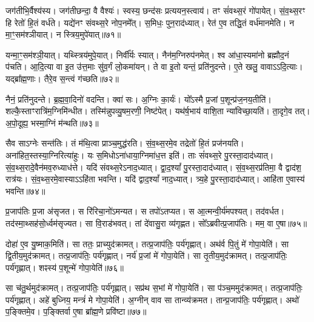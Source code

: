 जग॑तीभि॒र्वैश्य॑स्य।
जग॑तीछन्दा॒ वै वैश्यः॑।
स्वस्य॒ छन्द॑सः प्रत्ययन॒स्त्वाय॑।
तꣳ सं॑वथ्स॒रं गो॑पायेत्।
सं॒व॒थ्स॒रꣳ हि रेतो॑ हि॒तं वर्ध॑ते।
यद्ये॑नꣳ संवथ्स॒रे नोप॒नमे᳚त्।
स॒मिधः॒ पुन॒राद॑ध्यात्।
रेत॑ ए॒व तद्धि॒तं वर्ध॑मानमेति।
न मा॒ꣳ॒सम॑श्ञीयात्।
न स्त्रिय॒मुपे॑यात्॥७१॥

यन्मा॒ꣳ॒सम॑श्ञी॒यात्।
यथ्स्त्रिय॑मुपे॒यात्।
निर्वी᳚र्यः स्यात्।
नैन॑म॒ग्निरुप॑नमेत्।
श्व आ॑धा॒स्यमा॑नो ब्रह्मौद॒नं प॑चति।
आ॒दि॒त्या वा इ॒त उ॑त्त॒माः सु॑व॒र्गं लो॒कमा॑यन्।
ते वा इ॒तो यन्तं॒ प्रति॑\-नुदन्ते।
ए॒ते खलु॒ वावा\-ऽऽदि॒त्याः।
यद्ब्रा᳚ह्म॒णाः।
तैरे॒व स॒न्त्वं ग॑च्छति॥७२॥

नैनं॒ प्रति॑\-नुदन्ते।
ब्र॒ह्म॒वा॒दिनो॑ वदन्ति।
क्वा॑ सः।
अ॒ग्निः का॒र्यः॑।
यो᳚ऽस्मै प्र॒जां प॒शून्प्र॑ज॒नय॒तीति॑।
शल्कै॒स्ताꣳरात्रि॑म॒ग्निमि॑न्धीत।
तस्मि॑न्नुपव्यु॒षम॒रणी॒ निष्ट॑पेत्।
यथ॑र्\mbox{}ष॒भाय॑ वाशि॒ता न्या॑विच्छा॒यति॑।
ता॒दृगे॒व तत्।
अ॒पो॒दूह्य॒ भस्मा॒ग्निं म॑न्थति॥७३॥

सैव साऽग्नेः सन्त॑तिः।
तं म॑थि॒त्वा प्राञ्च॒मुद्ध॑रति।
सं॒व॒थ्स॒रमे॒व तद्रेतो॑ हि॒तं प्रज॑नयति।
अना॑हित॒स्तस्या॒ग्नि\-रित्या॑हुः।
यः स॒मिधो\-ऽना॑धाया॒ग्निमा॑ध॒त्त इति॑।
ताः सं॑वथ्स॒रे पु॒रस्ता॒दाद॑ध्यात्।
सं॒व॒थ्स॒रादे॒वैन॑मव॒रुध्याध॑त्ते।
यदि॑ संवथ्स॒रे\-ऽनाद॒ध्यात्।
द्वा॒द॒श्यां᳚ पु॒रस्ता॒दाद॑ध्यात्।
सं॒व॒थ्स॒रप्र॑तिमा॒ वै द्वाद॑श॒ रात्र॑यः।
सं॒व॒थ्स॒रमे॒वास्याऽऽहि॑ता भवन्ति।
यदि॑ द्वाद॒श्यां᳚ नाद॒ध्यात्।
त्र्य॒हे पु॒रस्ता॒दाद॑ध्यात्।
आहि॑ता ए॒वास्य॑ भवन्ति॥७४॥

प्र॒जा\-प॑तिः प्र॒जा अ॑\-सृजत।
स रि॑रिचा॒नो॑\-ऽमन्यत।
स तपो॑\-ऽतप्यत।
स आ॒त्मन्वी॒र्य॑मपश्यत्।
तद॑वर्धत।
तद॑स्मा॒थ्सह॑सो॒र्ध्वम॑सृज्यत।
सा वि॒राड॑भवत्।
तां दे॑वासु॒रा व्य॑गृह्णत।
सो᳚ऽब्रवीत्प्र॒जा\-प॑तिः।
मम॒ वा ए॒षा॥७५॥

दोहा॑ ए॒व यु॒ष्माक॒मिति॑।
सा ततः॒ प्राच्युद॑क्रामत्।
तत्प्र॒जा\-प॑तिः॒ पर्य॑गृह्णात्।
अथ॑र्व पि॒तुं मे॑ गोपा॒येति॑।
सा द्वि॒तीय॒मुद॑क्रामत्।
तत्प्र॒जा\-प॑तिः॒ पर्य॑गृह्णात्।
नर्य॑ प्र॒जां मे॑ गोपा॒येति॑।
सा तृ॒तीय॒\-मुद॑\-क्रामत्।
तत्प्र॒जा\-प॑तिः॒ पर्य॑गृह्णात्।
शꣴस्य॑ प॒शून्मे॑ गोपा॒येति॑॥७६॥

सा च॑तु॒र्थमुद॑क्रामत्।
तत्प्र॒जा\-प॑तिः॒ पर्य॑गृह्णात्।
सप्र॑थ स॒भां मे॑ गोपा॒येति॑।
सा प॑ञ्च॒ममुद॑क्रामत्।
तत्प्र॒जा\-प॑तिः॒ पर्य॑गृह्णात्।
अहे॑ बुध्निय॒ मन्त्रं॑ मे गोपा॒येति॑।
अ॒ग्नीन् वाव सा तान्व्य॑क्रमत।
तान्प्र॒जा\-प॑तिः॒ पर्य॑गृह्णात्।
अथो॑ प॒ङ्क्तिमे॒व।
प॒ङ्क्तिर्वा ए॒षा ब्रा᳚ह्म॒णे प्रवि॑ष्टा॥७७॥


